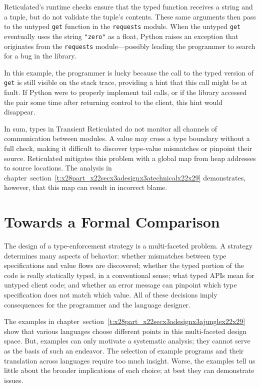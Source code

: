 \documentclass[ twoside,open=right,titlepage,numbers=noenddot,headinclude,%
                footinclude=true,cleardoublepage=empty,abstract=off,
                BCOR=5mm,paper=a4,fontsize=11pt,%
                ngerman,american,%
                parts,pdfspacing]{scrreprt}
\newcommand{\SecRef}[2]{section~#1}
\newcommand{\SecRefLocal}[3]{\hyperref[#1]{\SecRef{#2}{#3}}}
\newcommand{\Scribtexttt}[1]{{\texttt{#1}}}
\let\SOriginalthesubsubsection\thesubsubsection
\newcommand{\Ssubsection}[2]{\subsection[#1]{#2}\let\thesubsubsection\SOriginalthesubsubsection}
\renewcommand{\Ssubsection}[2]{\section[#1]{#2}}
\renewcommand{\SecRefLocal}[3]{section~\ref{#1}}
\begin{document}
Reticulated{'}s runtime checks ensure that the typed function receives a
 string and a tuple, but do not validate the tuple{'}s contents.
These same arguments then pass to the untyped \Scribtexttt{get} function in the
 \Scribtexttt{requests} module.
When the untyped \Scribtexttt{get} eventually uses the string
 \Scribtexttt{"zero"} as a float, Python raises an exception that
 originates from the \Scribtexttt{requests} module{---}possibly leading the programmer to
 search for a bug in the library.

In this example, the programmer is lucky because the call to the typed
 version of \Scribtexttt{get} is still visible on the stack trace,
 providing a hint that this call might be at fault.
If Python were to properly implement tail calls, or if the library accessed
 the pair some time after returning control to the client, this hint would disappear.

In sum, types in Transient Reticulated do not monitor all channels of
 communication between modules.
A value may cross a type boundary without a full check, making it difficult
 to discover type{-}value mismatches or pinpoint their source.
Reticulated mitigates this problem with a global map from heap
 addresses to source locations.
The analysis in chapter~\SecRefLocal{t:x28part_x22secx3adesignx3atechnicalx22x29}{4.5}{Technical Development} demonstrates, however,
 that this map can result in incorrect blame.

\Ssubsection{Towards a Formal Comparison}{Towards a Formal Comparison}\label{t:x28part_x22secx3adesignx3apropertiesx22x29}

The design of a type{-}enforcement strategy is a multi{-}faceted problem.
A strategy determines many aspects of behavior:
 whether mismatches between type specifications and value flows are discovered;
 whether the typed portion of the code is really statically typed, in a conventional sense;
 what typed APIs mean for untyped client code;
 and whether an error message can pinpoint which type specification does not
 match which value.
All of these decisions imply consequences for the programmer and the language
designer.

The examples in chapter~\SecRefLocal{t:x28part_x22secx3adesignx3ajunglex22x29}{4.2}{Assorted Behaviors by Example} show that
 various languages choose different points in this multi{-}faceted design space.
But, examples can only motivate a systematic analysis; they
 cannot serve as the basis of such an endeavor.
The selection of example programs and their translation across languages
 require too much insight.
Worse, the examples tell us little about the broader implications of each
 choice; at best they can demonstrate issues.
\end{document}
